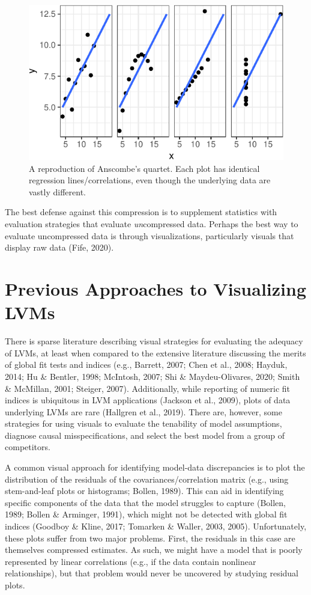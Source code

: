 \documentclass[
  english,
  man]{apa6}
\begin{document}
\begin{figure}

{\centering \includegraphics[width=0.5\linewidth]{flexplavaan_draft_files/figure-latex/anscombe-1} 

}

\caption{A reproduction of Anscombe's quartet. Each plot has identical regression lines/correlations, even though the underlying data are vastly different.}\label{fig:anscombe}
\end{figure}

The best defense against this compression is to supplement statistics with evaluation strategies that evaluate \emph{un}compressed data. Perhaps the best way to evaluate uncompressed data is through visualizations, particularly visuals that display raw data (Fife, 2020).

\hypertarget{previous-approaches-to-visualizing-lvms}{%
\section{Previous Approaches to Visualizing LVMs}\label{previous-approaches-to-visualizing-lvms}}

There is sparse literature describing visual strategies for evaluating the adequacy of LVMs, at least when compared to the extensive literature discussing the merits of global fit tests and indices (e.g., Barrett, 2007; Chen et al., 2008; Hayduk, 2014; Hu \& Bentler, 1998; McIntosh, 2007; Shi \& Maydeu-Olivares, 2020; Smith \& McMillan, 2001; Steiger, 2007). Additionally, while reporting of numeric fit indices is ubiquitous in LVM applications (Jackson et al., 2009), plots of data underlying LVMs are rare (Hallgren et al., 2019). There are, however, some strategies for using visuals to evaluate the tenability of model assumptions, diagnose causal misspecifications, and select the best model from a group of competitors.

A common visual approach for identifying model-data discrepancies is to plot the distribution of the residuals of the covariances/correlation matrix (e.g., using stem-and-leaf plots or histograms; Bollen, 1989). This can aid in identifying specific components of the data that the model struggles to capture (Bollen, 1989; Bollen \& Arminger, 1991), which might not be detected with global fit indices (Goodboy \& Kline, 2017; Tomarken \& Waller, 2003, 2005). Unfortunately, these plots suffer from two major problems. First, the residuals in this case are themselves compressed estimates. As such, we might have a model that is poorly represented by linear correlations (e.g., if the data contain nonlinear relationships), but that problem would never be uncovered by studying residual plots.
\end{document}
